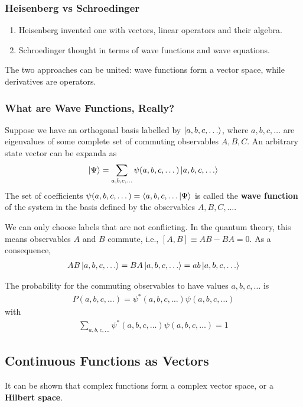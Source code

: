 \subsubsection{Heisenberg vs Schroedinger}
\begin{enumerate}
    \item Heisenberg invented one with vectors, linear operators and their algebra. 
    \item Schroedinger thought in terms of wave functions and wave equations. 
\end{enumerate}

The two approaches can be united: wave functions form a vector space, while derivatives are operators.

\subsubsection{What are Wave Functions, Really?}
Suppose we have an orthogonal basis labelled by $\ket{a,b,c,\dots}$, where $a,b,c,\dots$ are eigenvalues of some complete set of commuting observables $A, B, C$. An arbitrary state vector can be expanda as
\begin{align*}
    \ket{\Psi}=\sum_{a,b,c,\dots} \psi(a,b,c,\dots)\ket{a,b,c,\dots}
\end{align*}
The set of coefficients $\psi(a,b,c,\dots)=\braket{a,b,c,\dots|\Psi}$ is called the \textbf{wave function} of the system in the basis defined by the observables $A,B,C,\dots$. 

We can only choose labels that are not conflicting. In the quantum theory, this means observables $A$ and $B$ commute, i.e., $[A,B]\equiv AB-BA =0$. As a consequence, 
\begin{align*}
    AB\ket{a,b,c,\dots}=BA\ket{a,b,c,\dots}=ab\ket{a,b,c,\dots}
\end{align*}

The probability for the commuting observables to have values $a,b,c,\dots$ is 
\begin{align*}
    P(a,b,c,\dots)=\psi^{*}(a,b,c,\dots)\psi(a,b,c,\dots)
\end{align*}
with 
\begin{align*}
    \sum_{a,b,c,\dots}\psi^{*}(a,b,c,\dots)\psi(a,b,c,\dots)=1
\end{align*}

\subsection{Continuous Functions as Vectors}
It can be shown that complex functions form a complex vector space, or a \textbf{Hilbert space}. 

